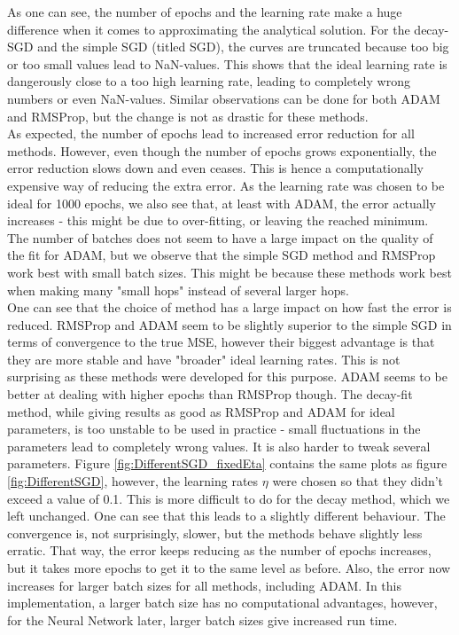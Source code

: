 \documentclass[11pt,a4paper,titlepage]{article}
\begin{document}
As one can see, the number of epochs and the learning rate make a huge difference when it comes to approximating the analytical solution. For the decay-SGD and the simple SGD (titled SGD), the curves are truncated because too big or too small values lead to NaN-values. This shows that the ideal learning rate is dangerously close to a too high learning rate, leading to completely wrong numbers or even NaN-values. Similar observations can be done for both ADAM and RMSProp, but the change is not as drastic for these methods.\\ 
As expected, the number of epochs lead to increased error reduction for all methods. However, even though the number of epochs grows exponentially, the error reduction slows down and even ceases. This is hence a computationally expensive way of reducing the extra error. As the learning rate was chosen to be ideal for 1000 epochs, we also see that, at least with ADAM, the error actually increases - this might be due to over-fitting, or leaving the reached minimum.\\
The number of batches does not seem to have a large impact on the quality of the fit for  ADAM, but we observe that the simple SGD method and RMSProp work best with small batch sizes. This might be because these methods work best when making many "small hops" instead of several larger hops.\\
One can see that the choice of method has a large impact on how fast the error is reduced. RMSProp and ADAM seem to be slightly superior to the simple SGD in terms of convergence to the true MSE, however their biggest advantage is that they are more stable and have "broader" ideal learning rates. This is not surprising as these methods were developed for this purpose. ADAM seems to be better at dealing with higher epochs than RMSProp though. The decay-fit method, while giving results as good as RMSProp and ADAM for ideal parameters, is too unstable to be used in practice - small fluctuations in the parameters lead to completely wrong values. It is also harder to tweak several parameters. 
Figure \ref{fig:DifferentSGD_fixedEta} contains the same plots as figure \ref{fig:DifferentSGD}, however, the learning rates $\eta$ were chosen so that they didn't exceed a value of 0.1. This is more difficult to do for the decay method, which we left unchanged. One can see that this leads to a slightly different behaviour. The convergence is, not surprisingly, slower, but the methods behave slightly less erratic. That way, the error keeps reducing as the number of epochs increases, but it takes more epochs to get it to the same level as before. Also, the error now increases for larger batch sizes for all methods, including ADAM. In this implementation, a larger batch size has no computational advantages, however, for the Neural Network later, larger batch sizes give increased run time. 
\end{document}
